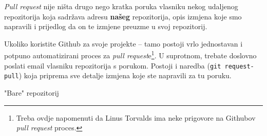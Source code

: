 \emph{Pull request} nije ništa drugo nego kratka poruka vlasniku nekog udaljenog repozitorija koja sadržava adresu \textbf{našeg} repozitorija, opis izmjena koje smo napravili i prijedlog da on te izmjene preuzme u svoj repozitorij.

Ukoliko koristite Github za svoje projekte -- tamo postoji vrlo jednostavan i potpuno automatizirani proces za \emph{pull request}e\footnote{Treba ovdje napomenuti da Linus Torvalds ima neke prigovore na Githubov \emph{pull request} proces.}.
U suprotnom, trebate doslovno poslati email vlasniku repozitorija s porukom.
Postoji i naredba (\verb+git request-pull+) koja priprema sve detalje izmjena koje ste napravili za tu poruku.

\TODO "Bare" repozitorij


